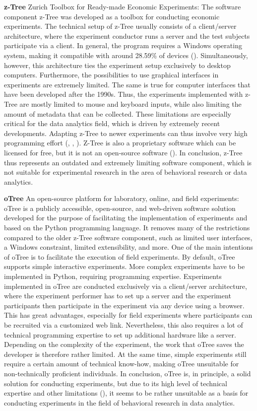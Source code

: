 \textbf{z-Tree} Zurich Toolbox for Ready-made Economic Experiments:
The software component z-Tree was developed as a toolbox for conducting economic experiments. The technical setup of z-Tree usually consists of a client/server architecture, where the experiment conductor runs a server and the test subjects participate via a client. In general, the program requires a Windows operating system, making it compatible with around 28.59\% of devices (\cite{statcounter.2023}). Simultaneously, however, this architecture ties the experiment setup exclusively to desktop computers. Furthermore, the possibilities to use graphical interfaces in experiments are extremely limited. The same is true for computer interfaces that have been developed after the 1990s. Thus, the experiments implemented with z-Tree are mostly limited to mouse and keyboard inputs, while also limiting the amount of metadata that can be collected. These limitations are especially critical for the data analytics field, which is driven by extremely recent developments. Adapting z-Tree to newer experiments can thus involve very high programming effort (\cite{Zurich.2023}, \cite{Fischbacher.2006}, \cite{Chen.2016}). Z-Tree is also a proprietary software which can be licensed for free, but it is not an open-source software (\cite{Fischbacher.2006}). In conclusion, z-Tree thus represents an outdated and extremely limiting software component, which is not suitable for experimental research in the area of behavioral research or data analytics.

\textbf{oTree} An open-source platform for laboratory, online, and field experiments:
oTree is a publicly accessible, open-source, and web-driven software solution developed for the purpose of facilitating the implementation of experiments and based on the Python programming language. It removes many of the restrictions compared to the older z-Tree software component, such as limited user interfaces, a Windows constraint, limited extensibility, and more. One of the main intentions of oTree is to facilitate the execution of field experiments. By default, oTree supports simple interactive experiments. More complex experiments have to be implemented in Python, requiring programming expertise. Experiments implemented in oTree are conducted exclusively via a client/server architecture, where the experiment performer has to set up a server and the experiment participants then participate in the experiment via any device using a browser. This has great advantages, especially for field experiments where participants can be recruited via a customized web link. Nevertheless, this also requires a lot of technical programming expertise to set up additional hardware like a server. Depending on the complexity of the experiment, the work that oTree saves the developer is therefore rather limited. At the same time, simple experiments still require a certain amount of technical know-how, making oTree unsuitable for non-technically proficient individuals. In conclusion, oTree is, in principle, a solid solution for conducting experiments, but due to its high level of technical expertise and other limitations (\cite{Chen.2016}), it seems to be rather unsuitable as a basis for conducting experiments in the field of behavioral research in data analytics. 

